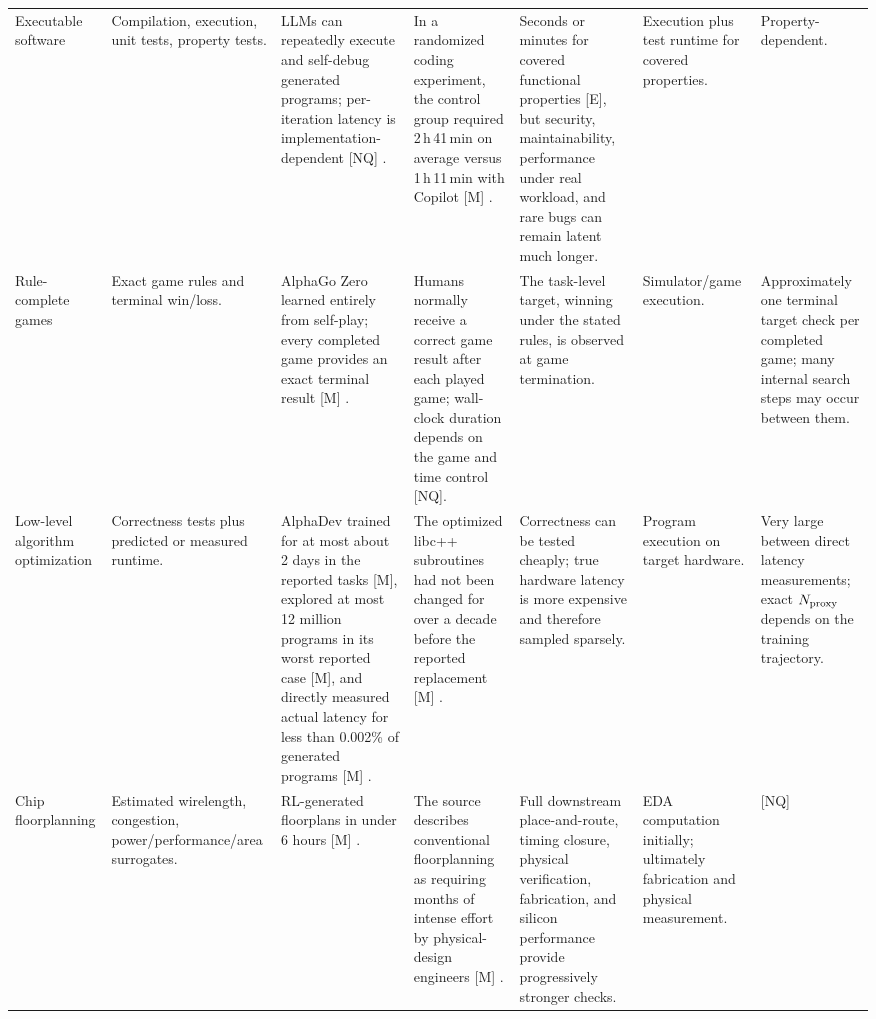 \begin{landscape}
\begin{center}
\begin{longtable}{
    @{}
    p{2.0cm}
    p{3.0cm}
    p{2.85cm}
    p{2.75cm}
    p{3.05cm}
    p{2.75cm}
    p{2.55cm}
    @{}
}
\\[3pt]

Executable software
&
Compilation, execution, unit tests, property tests.
&
LLMs can repeatedly execute and self-debug generated programs;
per-iteration latency is implementation-dependent [NQ]
\parencite{chen2023selfdebug}.
&
In a randomized coding experiment, the control group required
2\,h\,41\,min on average versus 1\,h\,11\,min with Copilot [M]
\parencite{peng2023copilot}.
&
Seconds or minutes for covered functional properties [E], but security,
maintainability, performance under real workload, and rare bugs can
remain latent much longer.
&
Execution plus test runtime for covered properties.
&
Property-dependent.

\\[3pt]

Rule-complete games
&
Exact game rules and terminal win/loss.
&
AlphaGo Zero learned entirely from self-play; every completed game
provides an exact terminal result [M] \parencite{silver2017alphagozero}.
&
Humans normally receive a correct game result after each played game;
wall-clock duration depends on the game and time control [NQ].
&
The task-level target, winning under the stated rules, is observed at
game termination.
&
Simulator/game execution.
&
Approximately one terminal target check per completed game; many
internal search steps may occur between them.

\\[3pt]

Low-level algorithm optimization
&
Correctness tests plus predicted or measured runtime.
&
AlphaDev trained for at most about 2 days in the reported tasks [M],
explored at most 12 million programs in its worst reported case [M],
and directly measured actual latency for less than 0.002\% of generated
programs [M] \parencite{mankowitz2023alphadev}.
&
The optimized libc++ subroutines had not been changed for over a
decade before the reported replacement [M]
\parencite{mankowitz2023alphadev}.
&
Correctness can be tested cheaply; true hardware latency is more
expensive and therefore sampled sparsely.
&
Program execution on target hardware.
&
Very large between direct latency measurements; exact $N_{\mathrm{proxy}}$ depends on
the training trajectory.

\\[3pt]

Chip floorplanning
&
Estimated wirelength, congestion, power/performance/area surrogates.
&
RL-generated floorplans in under 6 hours [M]
\parencite{mirhoseini2021chip}.
&
The source describes conventional floorplanning as requiring months of
intense effort by physical-design engineers [M]
\parencite{mirhoseini2021chip}.
&
Full downstream place-and-route, timing closure, physical verification,
fabrication, and silicon performance provide progressively stronger
checks.
&
EDA computation initially; ultimately fabrication and physical
measurement.
&
[NQ]


\end{longtable}
\end{center}
\end{landscape}
